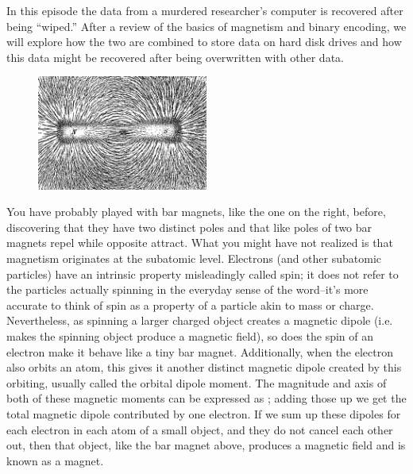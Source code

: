 \newpage
{}
{}
\setcounter{activity}{0}

In this episode the data from a murdered researcher's computer is recovered after being ``wiped.'' After a review of the basics of magnetism and binary encoding, we will explore how the two are combined to store data on hard disk drives and how this data might be recovered after being overwritten with other data.




	\begin{figure}[H]
	   \centering
	   \includegraphics[width=0.5\textwidth]{../sections/seasons/season1/111/images/magnet.png} 
	\end{figure}


You have probably played with bar magnets, like the one on the right, before, discovering that they have two distinct poles and that like poles of two bar magnets repel while opposite attract. What you might have not realized is that magnetism originates at the subatomic level. Electrons (and other subatomic particles) have an intrinsic property misleadingly called spin; it does not refer to the particles actually spinning in the everyday sense of the word--it's more accurate to think of spin as a property of a particle akin to mass or charge. Nevertheless, as spinning a larger charged object creates a magnetic dipole (i.e. makes the spinning object produce a magnetic field), so does the spin of an electron make it behave like a tiny bar magnet. Additionally, when the electron also orbits an atom, this gives it another distinct magnetic dipole created by this orbiting, usually called the orbital dipole moment. The magnitude and axis of both of these magnetic moments can be expressed as ; adding those up we get the total magnetic dipole contributed by one electron. If we sum up these dipoles for each electron in each atom of a small object, and they do not cancel each other out, then that object, like the bar magnet above, produces a magnetic field and is known as a magnet.


